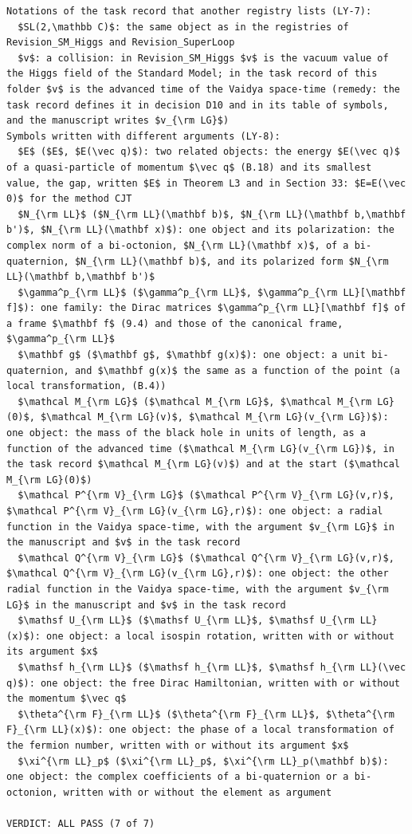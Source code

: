 \documentclass[
  10pt,
]{article}
\begin{document}
\begin{verbatim}
Notations of the task record that another registry lists (LY-7):
  $SL(2,\mathbb C)$: the same object as in the registries of Revision_SM_Higgs and Revision_SuperLoop
  $v$: a collision: in Revision_SM_Higgs $v$ is the vacuum value of the Higgs field of the Standard Model; in the task record of this folder $v$ is the advanced time of the Vaidya space-time (remedy: the task record defines it in decision D10 and in its table of symbols, and the manuscript writes $v_{\rm LG}$)
Symbols written with different arguments (LY-8):
  $E$ ($E$, $E(\vec q)$): two related objects: the energy $E(\vec q)$ of a quasi-particle of momentum $\vec q$ (B.18) and its smallest value, the gap, written $E$ in Theorem L3 and in Section 33: $E=E(\vec 0)$ for the method CJT
  $N_{\rm LL}$ ($N_{\rm LL}(\mathbf b)$, $N_{\rm LL}(\mathbf b,\mathbf b')$, $N_{\rm LL}(\mathbf x)$): one object and its polarization: the complex norm of a bi-octonion, $N_{\rm LL}(\mathbf x)$, of a bi-quaternion, $N_{\rm LL}(\mathbf b)$, and its polarized form $N_{\rm LL}(\mathbf b,\mathbf b')$
  $\gamma^p_{\rm LL}$ ($\gamma^p_{\rm LL}$, $\gamma^p_{\rm LL}[\mathbf f]$): one family: the Dirac matrices $\gamma^p_{\rm LL}[\mathbf f]$ of a frame $\mathbf f$ (9.4) and those of the canonical frame, $\gamma^p_{\rm LL}$
  $\mathbf g$ ($\mathbf g$, $\mathbf g(x)$): one object: a unit bi-quaternion, and $\mathbf g(x)$ the same as a function of the point (a local transformation, (B.4))
  $\mathcal M_{\rm LG}$ ($\mathcal M_{\rm LG}$, $\mathcal M_{\rm LG}(0)$, $\mathcal M_{\rm LG}(v)$, $\mathcal M_{\rm LG}(v_{\rm LG})$): one object: the mass of the black hole in units of length, as a function of the advanced time ($\mathcal M_{\rm LG}(v_{\rm LG})$, in the task record $\mathcal M_{\rm LG}(v)$) and at the start ($\mathcal M_{\rm LG}(0)$)
  $\mathcal P^{\rm V}_{\rm LG}$ ($\mathcal P^{\rm V}_{\rm LG}(v,r)$, $\mathcal P^{\rm V}_{\rm LG}(v_{\rm LG},r)$): one object: a radial function in the Vaidya space-time, with the argument $v_{\rm LG}$ in the manuscript and $v$ in the task record
  $\mathcal Q^{\rm V}_{\rm LG}$ ($\mathcal Q^{\rm V}_{\rm LG}(v,r)$, $\mathcal Q^{\rm V}_{\rm LG}(v_{\rm LG},r)$): one object: the other radial function in the Vaidya space-time, with the argument $v_{\rm LG}$ in the manuscript and $v$ in the task record
  $\mathsf U_{\rm LL}$ ($\mathsf U_{\rm LL}$, $\mathsf U_{\rm LL}(x)$): one object: a local isospin rotation, written with or without its argument $x$
  $\mathsf h_{\rm LL}$ ($\mathsf h_{\rm LL}$, $\mathsf h_{\rm LL}(\vec q)$): one object: the free Dirac Hamiltonian, written with or without the momentum $\vec q$
  $\theta^{\rm F}_{\rm LL}$ ($\theta^{\rm F}_{\rm LL}$, $\theta^{\rm F}_{\rm LL}(x)$): one object: the phase of a local transformation of the fermion number, written with or without its argument $x$
  $\xi^{\rm LL}_p$ ($\xi^{\rm LL}_p$, $\xi^{\rm LL}_p(\mathbf b)$): one object: the complex coefficients of a bi-quaternion or a bi-octonion, written with or without the element as argument

VERDICT: ALL PASS (7 of 7)
\end{verbatim}
\end{document}

